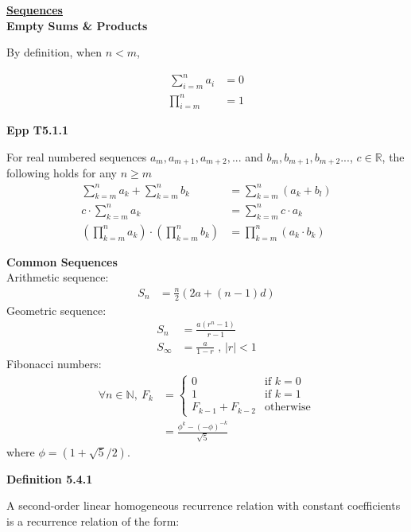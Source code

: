 \documentclass[a4paper]{article}
\newcommand{\heading}[1]{{\small\underline{\textbf{#1}}}}
\newcommand{\subheading}[1]{{\scriptsize\textbf{#1}}}
\begin{document}
\begin{multicols*}{4}
\heading{Sequences}\\

\subheading{Empty Sums \& Products}

By definition, when $n < m$,

\begin{align*}
\sum^n_{i=m} a_i &= 0 \\
\prod^n_{i=m} &= 1
\end{align*}

\subheading{Epp T5.1.1}

For real numbered sequences $a_m, a_{m+1}, a_{m+2}, ...$ and $b_m, b_{m+1},
b_{m+2}...$, $c \in \mathbb{R}$, the following holds for any $n \geq m$
\begin{align*}
\sum^n_{k=m} a_k + \sum^n_{k=m} b_k &= \sum^n_{k=m}(a_k + b_l) \\
c \cdot \sum^n_{k=m} a_k &= \sum^n_{k=m} c \cdot a_k\\
\left ( \prod^n_{k=m} a_k \right ) \cdot \left ( \prod^n_{k=m} b_k \right ) &=
  \prod^n_{k=m}(a_k \cdot b_k)
\end{align*}

\vspace{0.3cm}

\subheading{Common Sequences}\\

Arithmetic sequence:
\begin{align*}
S_n &= \frac{n}{2} ( 2a + (n-1)d )
\end{align*}
Geometric sequence:
\begin{align*}
S_n &= \frac{a(r^n - 1)}{r - 1} \\
S_{\infty} &= \frac{a}{1-r}\text{ ,\ \ \ \ $|r| < 1$}
\end{align*}
Fibonacci numbers:
\begin{align*}
\forall n \in \mathbb{N},\ F_k &= \begin{cases}
  0 & \text{if $k=0$} \\
  1 & \text{if $k=1$} \\
  F_{k-1} + F_{k-2} & \text{otherwise}
\end{cases} \\
  &= \frac{\phi^k - (- \phi)^{-k}}{\sqrt{5}}
\end{align*}
where $\phi = (1+\sqrt{5}/2)$.

\vspace{0.3cm}

\subheading{Definition 5.4.1}

A second-order linear homogeneous recurrence relation with constant coefficients
is a recurrence relation of the form:


\end{multicols*}
\end{document}
